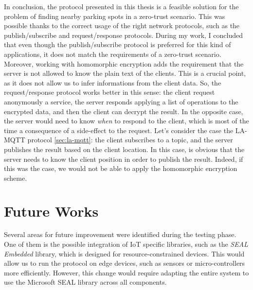 In conclusion, the protocol presented in this thesis is a feasible solution for the problem of finding nearby parking spots in a zero-trust scenario. This was possible thanks to the correct usage of the right network protocols, such as the publish/subscribe and request/response protocols. During my work, I concluded that even though the publish/subscribe protocol is preferred for this kind of applications, it does not match the requirements of a zero-trust scenario. Moreover, working with homomorphic encryption adds the requirement that the server is not allowed to know the plain text of the clients. This is a crucial point, as it does not allow us to infer informations from the client data. So, the request/response protocol works better in this sense: the client request anonymously a service, the server responds applying a list of operations to the encrypted data, and then the client can decrypt the result. In the opposite case, the server would need to know \emph{when} to respond to the client, which is most of the time a consequence of a side-effect to the request. Let's consider the case the LA-MQTT protocol \cref{sec:la-mqtt}: the client subscribes to a topic, and the server publishes the result based on the client location. In this case, is obvious that the server needs to know the client position in order to publish the result. Indeed, if this was the case, we would not be able to apply the homomorphic encryption scheme.

\section{Future Works}

Several areas for future improvement were identified during the testing phase. One of them is the possible integration of IoT specific libraries, such as the \emph{SEAL Embedded} \cite{sealembedded} library, which is designed for resource-constrained devices. This would allow us to run the protocol on edge devices, such as sensors or micro-controllers more efficiently. However, this change would require adapting the entire system to use the Microsoft SEAL\cite{sealcrypto} library across all components.

